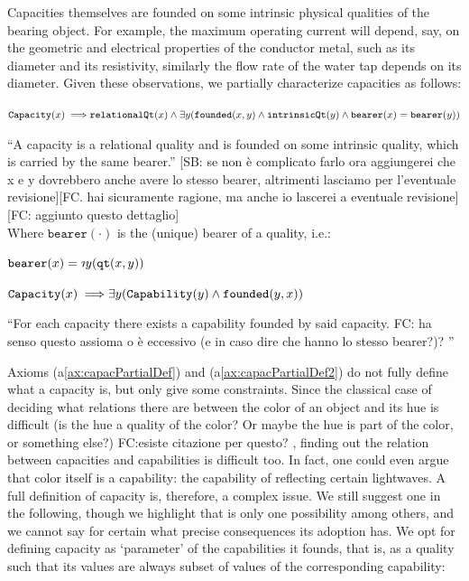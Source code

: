 \documentclass[sw]{iosart2x}
\newcommand{\bflist}{\begin{list}{}{\setlength{\topsep}{2mm}\setlength{\partopsep}{0mm}\setlength{\parsep}{0mm}\setlength{\leftmargin}{9mm}\setlength{\labelwidth}{8mm}}}
\newcommand{\eflist}{\end{list}}
\newcommand{\AxLabel}{\textrm{a}}
\newcommand{\DefLabel}{\textrm{d}}
\newcounter{cntax}
\newcommand{\myax}[1]{\refstepcounter{cntax}\begin{small}{\bf \AxLabel\thecntax\label{ax:#1}}\end{small}}
\newcounter{cntdef}
\newcommand{\mydf}[1]{\refstepcounter{cntdef}\begin{small}{\bf \DefLabel\thecntdef\label{def:#1}}\end{small}}
\newcommand{\mytext}[1]{``#1''}
\newcommand{\refax}[1]{({\AxLabel}\ref{#1})}
\newcommand{\generalStyle}[1]{\texttt{#1}}
\newcommand{\biRel}[3]{\generalStyle{#1}(#2,#3)}
\newcommand{\uniRel}[2]{\generalStyle{#1}(#2)}
\newcommand{\myfi}{\hspace{0.9mm} \Longrightarrow}
\newcommand{\suchthat}{\rotatebox[origin=c]{180}{$\iota$}}
\newcommand{\DOLCEQualityDirect}[2]{\biRel{qt}{#1}{#2}}
\newcommand{\bearer}[1]{\uniRel{bearer}{#1}}
\newcommand{\Capability}[1]{\uniRel{Capability}{#1}}
\newcommand{\Capacity}[1]{\uniRel{Capacity}{#1}}
\newcommand{\RelationalQuality}[1]{\uniRel{relationalQt}{#1}}
\newcommand{\IntrinsicQuality}[1]{\uniRel{intrinsicQt}{#1}}
\newcommand{\founded}[2]{\biRel{\foundedTerm{passive}}{#1}{#2}}
\newcommand{\foundedTerm}[1]{%
  \ifthenelse{\equal{#1}{passive}}{founded}{%
    \ifthenelse{\equal{#1}{verb}}{found}{%
      \ifthenelse{\equal{#1}{gerund}}{founding}{%
        ERROR!%
      }%
    }%
  }%
}
\newcommand{\quotes}[1]{`#1'}
\newcommand{\TODO}[1]{{\color{red} #1
}}
\newcommand{\TODOinline}[1]{{\color{red} #1
}}
\begin{document}
Capacities themselves are founded on some intrinsic physical qualities of the bearing object. For example, the maximum operating current will depend, say, on the geometric and electrical properties of the conductor metal, such as its diameter and its resistivity, similarly the flow rate of the water tap depends on its diameter. Given these observations, we partially characterize capacities as follows:   
\bflist
\item[\myax{capacPartialDef}] $ \Capacity{x} \myfi \RelationalQuality{x} \land \exists y(\founded{x}{y} \land \IntrinsicQuality{y} \land \bearer{x} = \bearer{y}) $%
\item[] \mytext{A capacity is a relational quality and is founded on some intrinsic quality, which is carried by the same bearer.}\TODOinline{[SB: se non è complicato farlo ora aggiungerei che x e y dovrebbero anche avere lo stesso bearer, altrimenti lasciamo per l'eventuale revisione][FC. hai sicuramente ragione, ma anche io lascerei a eventuale revisione][FC: aggiunto questo dettaglio]}
\\ Where $\bearer{\cdot}$ is the (unique) bearer of a quality, i.e.:
\item[\mydf{beareDef}] $ \bearer{x} = \suchthat y (\DOLCEQualityDirect{x}{y}) $ 
\item[\myax{capacPartialDef2}] $ \Capacity{x} \myfi \exists y( \Capability{y} \land \founded{y}{x}) $  %
\item[] \mytext{For each capacity there exists a capability founded by said capacity.\TODO{FC: ha senso questo assioma o è eccessivo (e in caso dire che hanno lo stesso bearer?)?}}
\eflist
Axioms \refax{ax:capacPartialDef} and \refax{ax:capacPartialDef2} do not fully define what a capacity is, but only give some constraints.
Since the classical case of deciding what relations there are between the color of an object and its hue is difficult (is the hue a quality of the color? Or maybe the hue is part of the color, or something else?)\TODO{FC:esiste citazione per questo?}, finding out the relation between capacities and capabilities is difficult too. In fact, one could even argue that color itself is a capability: the capability of reflecting certain lightwaves.
A full definition of capacity is, therefore, a complex issue.
We still suggest one in the following, though we highlight that is only one possibility among others, and we cannot say for certain what precise consequences its adoption has.
We opt for defining capacity as \quotes{parameter} of the capabilities it founds, that is, as a quality such that its values are always subset of values of the corresponding capability:
\end{document}
